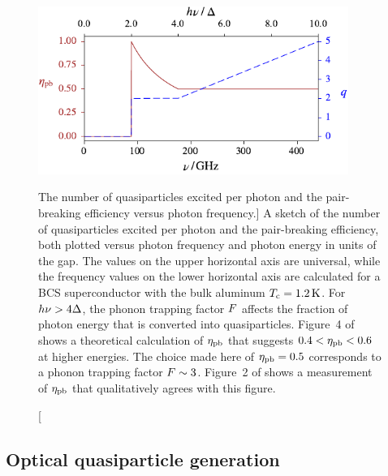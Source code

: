 \begin{figure}[htb]
\centering
\includegraphics[width=0.9\textwidth]{theory/quasiparticles_per_photon_and_pairbreaking_efficiency.pdf}
\caption
[The number of quasiparticles excited per photon and the pair-breaking efficiency versus photon frequency.]
{A sketch of the number of quasiparticles excited per photon and the pair-breaking efficiency, both plotted versus photon frequency and photon energy in units of the gap.
The values on the upper horizontal axis are universal, while the frequency values on the lower horizontal axis are calculated for a BCS superconductor with the bulk aluminum $T_{\mathrm{c}} = \SI{1.2}{K}$.
For $h \nu > 4 \Delta$, the phonon trapping factor $F$ affects the fraction of photon energy that is converted into quasiparticles.
Figure~4 of \textcite{Guruswamy2014SUST} shows a theoretical calculation of $\eta_\mathrm{pb}$ that suggests $0.4 < \eta_\mathrm{pb} < 0.6$ at higher energies.
The choice made here of $\eta_\mathrm{pb} = 0.5$ corresponds to a phonon trapping factor $F \sim 3$.
Figure~2 of \textcite{deVisser2015APL} shows a measurement of $\eta_\mathrm{pb}$ that qualitatively agrees with this figure.
}
\label{fig:quasiparticles_per_photon_and_pairbreaking_efficiency}
\end{figure}

\subsection{Optical quasiparticle generation}
\label{sec:theory.response.generation}

